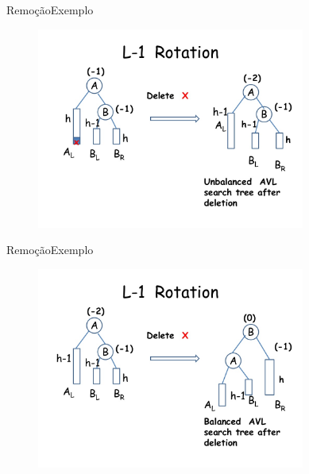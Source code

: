 \documentclass[aspectratio=169]{beamer}
\begin{document}

\begin{frame}{Remoção}{Exemplo}
\begin{figure}[!h]
  \centering
  \includegraphics[width=250pt]{imagens/exemplo_remocao17.png}
  \label{fig_exemplo_remocao17}
\end{figure}
\end{frame}


\begin{frame}{Remoção}{Exemplo}
\begin{figure}[!h]
  \centering
  \includegraphics[width=250pt]{imagens/exemplo_remocao18.png}
  \label{fig_exemplo_remocao18}
\end{figure}
\end{frame}

%
%
\end{document}
